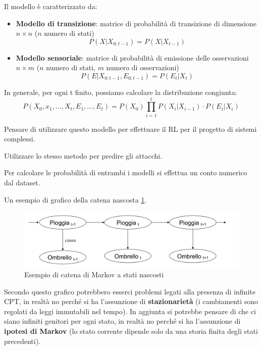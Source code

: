 Il modello è caratterizzato da:
\begin{itemize}
    \item \textbf{Modello di transizione}: matrice di probabilità di transizione
          di dimensione $n\times n$ ($n$ numero di stati)
          \begin{equation*}
              P(X | X_{0:t-1}) = P(X | X_{t-1})
          \end{equation*}
    \item \textbf{Modello sensoriale}: matrice di probabilità di emissione delle
          osservazioni  $n\times m$ ($n$ numero di stati, $m$ numero di osservazioni)
          \begin{equation*}
              P(E | X_{0:t-1}, E_{0:t-1}) = P(E_{t} | X_{t})
          \end{equation*}
\end{itemize}
In generale, per ogni t finito, possiamo calcolare la distribuzione congiunta:
\begin{equation}
    P(X_0, x_1,\dots,X_t, E_1,\dots, E_t) = P(X_0) \prod_{i=1}^{t}P(X_i|X_{i-1}) \cdot P(E_i|X_i)
\end{equation}
\begin{nota}
    Pensare di utilizzare questo modello per effettuare il RL per il progetto di
    sistemi complessi.

    Utilizzare lo stesso metodo per predire gli attacchi.
\end{nota}
\begin{nota}
    Per calcolare le probabilità di entrambi i modelli si effettua un conto
    numerico dal dataset.
\end{nota}

Un esempio di grafico della catena nascosta \ref{fig:HMM}.
\begin{figure}[!ht]
    \centering
    \includegraphics[width=.5\textwidth]{img/catene/hmm.png}
    \caption{Esempio di catena di Markov a stati nascosti}
    \label{fig:HMM}
\end{figure}

Secondo questo grafico potrebbero esserci problemi legati alla presenza di infinite
CPT, in realtà no perché si ha l'assunzione di \textbf{stazionarietà} (i cambiamenti
sono regolati da leggi immutabili nel tempo). In aggiunta si potrebbe pensare di
che ci siano infiniti genitori per ogni stato, in realtà no perché si ha l'assunzione
di \textbf{ipotesi di Markov} (lo stato corrente dipende solo da una storia finita
degli stati precedenti).

